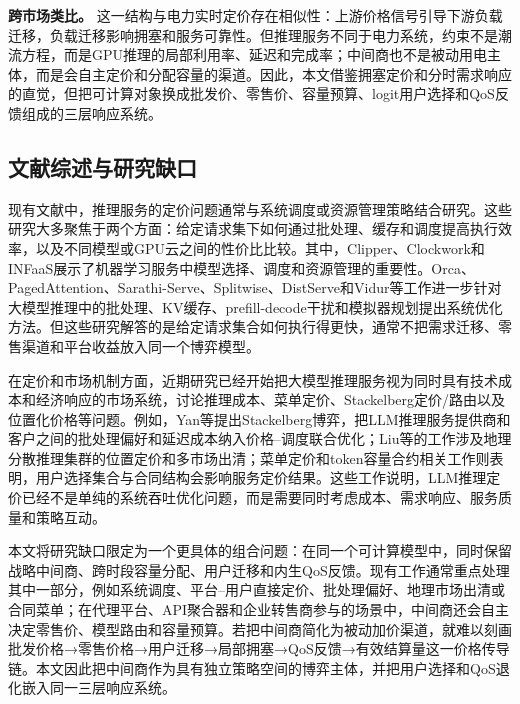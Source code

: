 \documentclass[UTF8,11pt]{ctexart}
\begin{document}
\textbf{跨市场类比。} 这一结构与电力实时定价存在相似性：上游价格信号引导下游负载迁移，负载迁移影响拥塞和服务可靠性。但推理服务不同于电力系统，约束不是潮流方程，而是GPU推理的局部利用率、延迟和完成率；中间商也不是被动用电主体，而是会自主定价和分配容量的渠道。因此，本文借鉴拥塞定价和分时需求响应的直觉，但把可计算对象换成批发价、零售价、容量预算、logit用户选择和QoS反馈组成的三层响应系统。

\subsection{文献综述与研究缺口}
\label{sec:related_work}

现有文献中，推理服务的定价问题通常与系统调度或资源管理策略结合研究\cite{crankshaw2017clipper,yu2022orca,kwon2023pagedattention}。这些研究大多聚焦于两个方面：给定请求集下如何通过批处理、缓存和调度提高执行效率，以及不同模型或GPU云之间的性价比比较。其中，Clipper、Clockwork和INFaaS展示了机器学习服务中模型选择、调度和资源管理的重要性\cite{crankshaw2017clipper,gujarati2020clockwork,romero2021infaas}。Orca、PagedAttention、Sarathi-Serve、Splitwise、DistServe和Vidur等工作进一步针对大模型推理中的批处理、KV缓存、prefill-decode干扰和模拟器规划提出系统优化方法\cite{yu2022orca,kwon2023pagedattention,agrawal2024sarathiserve,patel2024splitwise,zhong2024distserve,agrawal2024vidur}。但这些研究解答的是给定请求集合如何执行得更快，通常不把需求迁移、零售渠道和平台收益放入同一个博弈模型。

在定价和市场机制方面，近期研究已经开始把大模型推理服务视为同时具有技术成本和经济响应的市场系统，讨论推理成本、菜单定价、Stackelberg定价/路由以及位置化价格等问题\cite{demirer2025emerging,erdil2025inference,bergemann2025menu,guo2026prillm,yan2026stackelberg,liu2026locational}。例如，Yan等提出Stackelberg博弈，把LLM推理服务提供商和客户之间的批处理偏好和延迟成本纳入价格--调度联合优化；Liu等的工作涉及地理分散推理集群的位置定价和多市场出清；菜单定价和token容量合约相关工作则表明，用户选择集合与合同结构会影响服务定价结果\cite{bergemann2025menu,xing2026tokenfutures}。这些工作说明，LLM推理定价已经不是单纯的系统吞吐优化问题，而是需要同时考虑成本、需求响应、服务质量和策略互动。

本文将研究缺口限定为一个更具体的组合问题：在同一个可计算模型中，同时保留战略中间商、跨时段容量分配、用户迁移和内生QoS反馈。现有工作通常重点处理其中一部分，例如系统调度、平台--用户直接定价、批处理偏好、地理市场出清或合同菜单；在代理平台、API聚合器和企业转售商参与的场景中，中间商还会自主决定零售价、模型路由和容量预算。若把中间商简化为被动加价渠道，就难以刻画批发价格→零售价格→用户迁移→局部拥塞→QoS反馈→有效结算量这一价格传导链。本文因此把中间商作为具有独立策略空间的博弈主体，并把用户选择和QoS退化嵌入同一三层响应系统。
\end{document}
